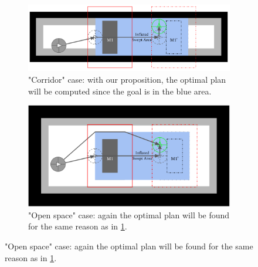 \begin{figure}[H]
\centering
\begin{subfigure}{.48\textwidth}
  \centering
  \includegraphics[width=\linewidth]{Figures/Check_New_Opening/corridor_swept.png}
  \caption{"Corridor" case: with our proposition, the optimal plan will be computed since the goal is in the blue area.}
  \label{fig:corridor_swept}
\end{subfigure}\hspace*{\fill}
\begin{subfigure}{.48\textwidth}
  \centering
  \includegraphics[width=\linewidth]{Figures/Check_New_Opening/openspace_swept.png}
  \caption{"Open space" case: again the optimal plan will be found for the same reason as in \ref{fig:corridor_swept}.}
  \label{fig:openspace_swept}
\end{subfigure}

\medskip


\end{figure}
